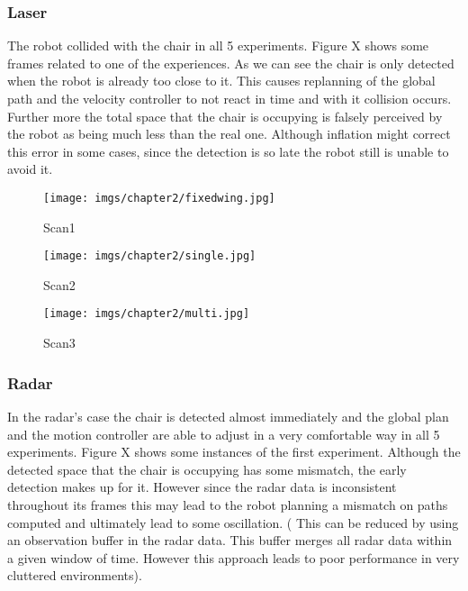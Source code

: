 \subsubsection{Laser}
The robot collided with the chair in all 5 experiments. Figure X shows some frames related to one of the experiences. As we can see the chair is only detected when the robot is already too close to it. This causes replanning of the global path and the velocity controller to not react in time and with it collision occurs. Further more the total space that the chair is occupying is falsely perceived by the robot as being much less than the real one. Although inflation might correct this error in some cases, since the detection is so late the robot still is unable to avoid it.
\begin{figure}[h] 
    \begin{minipage}[b]{.32\linewidth}
        \texttt{[image: imgs/chapter2/fixedwing.jpg]}
        \caption{Scan1}
    \end{minipage}
    \begin{minipage}[b]{.32\linewidth}
        \texttt{[image: imgs/chapter2/single.jpg]}
        \caption{Scan2}
        
    \end{minipage}
     \begin{minipage}[b]{.32\linewidth}
        \texttt{[image: imgs/chapter2/multi.jpg]}
        \caption{Scan3}
    \end{minipage}
\end{figure}
\subsubsection{Radar}
In the radar's case the chair is detected almost immediately and the global plan and the motion controller are able to adjust in a very comfortable way in all 5 experiments. Figure X shows some instances of the first experiment. Although the detected space that the chair is occupying has some mismatch, the early detection makes up for it. However since the radar data is inconsistent throughout its frames this may lead to the robot planning a mismatch on paths computed and ultimately lead to some oscillation. ( This can be reduced by using an observation buffer in the radar data. This buffer merges all radar data within a given window of time. However this approach leads to poor performance in very cluttered environments).

